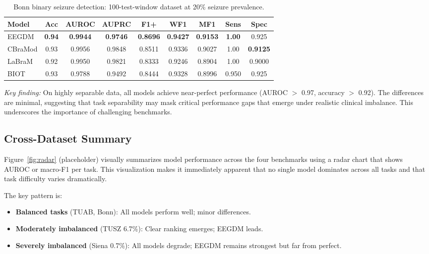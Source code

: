 \documentclass[journal]{IEEEtran}
\newcommand{\best}[1]{\textbf{#1}}
\begin{document}
\begin{table}[t]
\centering
\caption{Bonn binary seizure detection: 100-test-window dataset at 20\% seizure prevalence.}
\label{tab:bonn_results}
\small
\setlength{\tabcolsep}{2.5pt}
\begin{tabular}{@{}lcccccccc@{}}
\toprule
Model & Acc & AUROC & AUPRC & F1+ & WF1 & MF1 & Sens & Spec \\
\midrule
EEGDM & \best{0.94} & \best{0.9944} & \best{0.9746} & \best{0.8696} & \best{0.9427} & \best{0.9153} & \best{1.00} & 0.925 \\
CBraMod & 0.93 & 0.9956 & 0.9848 & 0.8511 & 0.9336 & 0.9027 & 1.00 & \best{0.9125} \\
LaBraM & 0.92 & 0.9950 & 0.9821 & 0.8333 & 0.9246 & 0.8904 & 1.00 & 0.9000 \\
BIOT & 0.93 & 0.9788 & 0.9492 & 0.8444 & 0.9328 & 0.8996 & 0.950 & 0.925 \\
\bottomrule
\end{tabular}
\end{table}

\textit{Key finding:} On highly separable data, all models achieve near-perfect performance (AUROC $>$ 0.97, accuracy $>$ 0.92). The differences are minimal, suggesting that task separability may mask critical performance gaps that emerge under realistic clinical imbalance. This underscores the importance of challenging benchmarks.

\subsection{Cross-Dataset Summary}

Figure~\ref{fig:radar} (placeholder) visually summarizes model performance across the four benchmarks using a radar chart that shows AUROC or macro-F1 per task. This visualization makes it immediately apparent that no single model dominates across all tasks and that task difficulty varies dramatically.

The key pattern is:
\begin{itemize}
  \item \textbf{Balanced tasks} (TUAB, Bonn): All models perform well; minor differences.
  \item \textbf{Moderately imbalanced} (TUSZ 6.7\%): Clear ranking emerges; EEGDM leads.
  \item \textbf{Severely imbalanced} (Siena 0.7\%): All models degrade; EEGDM remains strongest but far from perfect.
\end{itemize}
\end{document}
